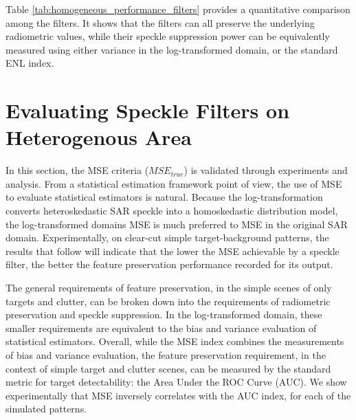 \documentclass[journal]{IEEEtran}
\begin{document}
Table \ref{tab:homogeneous_performance_filters} provides a quantitative comparison among the filters.
It shows that the filters can all preserve the underlying radiometric values, while their speckle suppression power can be equivalently measured using either variance in the log-transformed domain, or the standard ENL index.

\section{Evaluating Speckle Filters on Heterogenous Area}
\label{sec:eval_hetero}


In this section, the MSE criteria ($MSE_{true}$) is validated through experiments and analysis. 
From a statistical estimation framework point of view, the use of MSE to evaluate statistical estimators is natural.
Because the log-transformation converts heteroskedastic SAR speckle into a homoskedastic distribution model, 
	the log-transformed domains MSE is much preferred to MSE in the original SAR domain.
Experimentally, on clear-cut simple target-background patterns, the results that follow will indicate that
	the lower the MSE achievable by a speckle filter,
	the better the feature preservation performance recorded for its output.

The general requirements of feature preservation, in the simple scenes of only targets and clutter, can be broken down into the requirements of radiometric preservation and speckle suppression.
In the log-transformed domain, these smaller requirements are equivalent to the bias and variance evaluation of statistical estimators.
Overall, while the MSE index combines the measurements of bias and variance evaluation, 
	the feature preservation requirement, in the context of simple target and clutter scenes, can be measured by the standard metric for target detectability: the Area Under the ROC Curve (AUC).
We show experimentally that MSE inversely correlates with the AUC index, for each of the simulated patterns.
\end{document}
